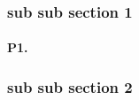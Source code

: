 \subsubsection{sub sub section 1}
\paragraph{P1.}
\lipsum[7]

\subsubsection{sub sub section 2}
\lipsum[8]
